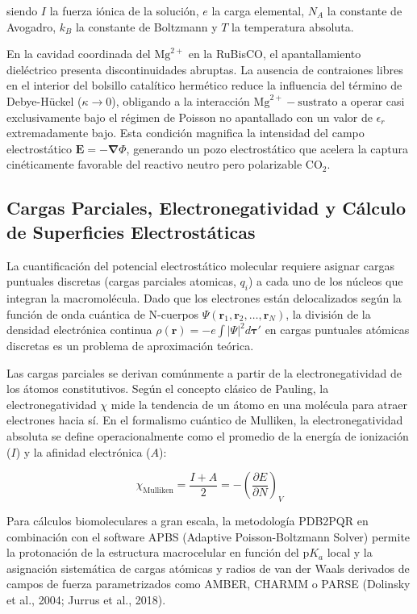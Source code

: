 \documentclass[12pt]{article}
\begin{document}
siendo $I$ la fuerza iónica de la solución, $e$ la carga elemental, $N_A$ la constante de Avogadro, $k_B$ la constante de Boltzmann y $T$ la temperatura absoluta.

En la cavidad coordinada del $\text{Mg}^{2+}$ en la RuBisCO, el apantallamiento dieléctrico presenta discontinuidades abruptas. La ausencia de contraiones libres en el interior del bolsillo catalítico hermético reduce la influencia del término de Debye-Hückel ($\kappa \to 0$), obligando a la interacción $\text{Mg}^{2+}-\text{sustrato}$ a operar casi exclusivamente bajo el régimen de Poisson no apantallado con un valor de $\epsilon_r$ extremadamente bajo. Esta condición magnifica la intensidad del campo electrostático $\mathbf{E} = -\mathbf{\nabla}\Phi$, generando un pozo electrostático que acelera la captura cinéticamente favorable del reactivo neutro pero polarizable $\text{CO}_2$.

\subsection{Cargas Parciales, Electronegatividad y Cálculo de Superficies Electrostáticas}

La cuantificación del potencial electrostático molecular requiere asignar cargas puntuales discretas (cargas parciales atomicas, $q_i$) a cada uno de los núcleos que integran la macromolécula. Dado que los electrones están delocalizados según la función de onda cuántica de N-cuerpos $\Psi(\mathbf{r}_1, \mathbf{r}_2, \dots, \mathbf{r}_N)$, la división de la densidad electrónica continua $\rho(\mathbf{r}) = -e \int |\Psi|^2 d\mathbf{\tau}'$ en cargas puntuales atómicas discretas es un problema de aproximación teórica.

Las cargas parciales se derivan comúnmente a partir de la electronegatividad de los átomos constitutivos. Según el concepto clásico de Pauling, la electronegatividad $\chi$ mide la tendencia de un átomo en una molécula para atraer electrones hacia sí. En el formalismo cuántico de Mulliken, la electronegatividad absoluta se define operacionalmente como el promedio de la energía de ionización ($I$) y la afinidad electrónica ($A$):

\begin{equation}
\chi_{\text{Mulliken}} = \frac{I + A}{2} = -\left( \frac{\partial E}{\partial N} \right)_V
\end{equation}

Para cálculos biomoleculares a gran escala, la metodología PDB2PQR en combinación con el software APBS (Adaptive Poisson-Boltzmann Solver) permite la protonación de la estructura macrocelular en función del $\text{p}K_a$ local y la asignación sistemática de cargas atómicas y radios de van der Waals derivados de campos de fuerza parametrizados como AMBER, CHARMM o PARSE (Dolinsky et al., 2004; Jurrus et al., 2018).
\end{document}
